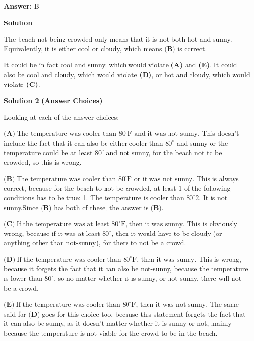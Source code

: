 \begin{enumerate}
 \textbf{Answer: }B



\textbf{Solution}

The beach not being crowded only means that it is not both hot and sunny. Equivalently, it is either cool or cloudy, which means $\boxed{\textbf{(B)}}$ is correct.

 It could be in fact cool and sunny, which would violate \textbf{(A)} and \textbf{(E)}. It could also be cool and cloudy, which would violate \textbf{(D)}, or hot and cloudy, which would violate \textbf{(C)}.

 



\textbf{Solution 2 (Answer Choices)}

Looking at each of the answer choices:

 $\textbf{(A)}\ \text{The temperature was cooler than } 80^{\circ} \text{F and it was not sunny.}$ This doesn't include the fact that it can also be either cooler than $80^{\circ}$ and sunny or the temperature could be at least $80^{\circ}$ and not sunny, for the beach not to be crowded, so this is wrong.

 $\textbf{(B)}\ \text{The temperature was cooler than } 80^{\circ} \text{F or it was not sunny.}$ This is always correct, because for the beach to not be crowded,  at least 1 of the following conditions has to be true: 1. The temperature is cooler than $80^{\circ}$2. It is not sunny.Since $\textbf{(B)}$ has both of these, the answer is $\boxed{\textbf{(B)}}$.

 $\textbf{(C)}\ \text{If the temperature was at least } 80^{\circ} \text{F, then it was sunny.}$ This is obviously wrong, because if it was at least $80^{\circ}$, then it would have to be cloudy (or anything other than not-sunny), for there to not be a crowd.

 $\textbf{(D)}\ \text{If the temperature was cooler than } 80^{\circ} \text{F, then it was sunny.}$ This is wrong, because it forgets the fact that it can also be not-sunny, because the temperature is lower than $80^{\circ}$, so no matter whether it is sunny, or not-sunny, there will not be a crowd.

 $\textbf{(E)}\ \text{If the temperature was cooler than } 80^{\circ} \text{F, then it was not sunny.}$ The same said for $\textbf{(D)}$ goes for this choice too, because this statement forgets the fact that it can also be sunny, as it doesn't matter whether it is sunny or not, mainly because the temperature is not viable for the crowd to be in the beach.


\end{enumerate}

